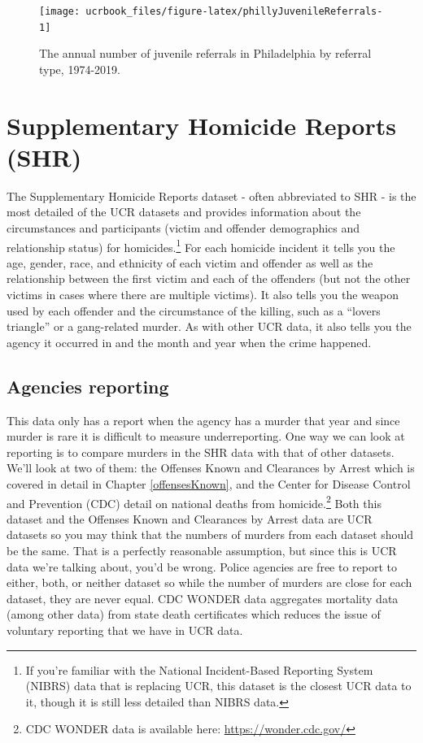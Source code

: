 \documentclass[
  12pt,
  openany]{book}
\begin{document}
\begin{figure}

{\centering \texttt{[image: ucrbook\_files/figure-latex/phillyJuvenileReferrals-1]} 

}

\caption{The annual number of juvenile referrals in Philadelphia by referral type, 1974-2019.}\label{fig:phillyJuvenileReferrals}
\end{figure}

\hypertarget{shr}{%
\chapter{Supplementary Homicide Reports (SHR)}\label{shr}}

The Supplementary Homicide Reports dataset - often abbreviated to SHR - is the most detailed of the UCR datasets and provides information about the circumstances and participants (victim and offender demographics and relationship status) for homicides.\footnote{If you're familiar with the National Incident-Based Reporting System (NIBRS) data that is replacing UCR, this dataset is the closest UCR data to it, though it is still less detailed than NIBRS data.} For each homicide incident it tells you the age, gender, race, and ethnicity of each victim and offender as well as the relationship between the first victim and each of the offenders (but not the other victims in cases where there are multiple victims). It also tells you the weapon used by each offender and the circumstance of the killing, such as a ``lovers triangle'' or a gang-related murder. As with other UCR data, it also tells you the agency it occurred in and the month and year when the crime happened.

\hypertarget{agencies-reporting-3}{%
\section{Agencies reporting}\label{agencies-reporting-3}}

This data only has a report when the agency has a murder that year and since murder is rare it is difficult to measure underreporting. One way we can look at reporting is to compare murders in the SHR data with that of other datasets. We'll look at two of them: the Offenses Known and Clearances by Arrest which is covered in detail in Chapter \ref{offensesKnown}, and the Center for Disease Control and Prevention (CDC) detail on national deaths from homicide.\footnote{CDC WONDER data is available here: \url{https://wonder.cdc.gov/}} Both this dataset and the Offenses Known and Clearances by Arrest data are UCR datasets so you may think that the numbers of murders from each dataset should be the same. That is a perfectly reasonable assumption, but since this is UCR data we're talking about, you'd be wrong. Police agencies are free to report to either, both, or neither dataset so while the number of murders are close for each dataset, they are never equal. CDC WONDER data aggregates mortality data (among other data) from state death certificates which reduces the issue of voluntary reporting that we have in UCR data.
\end{document}
